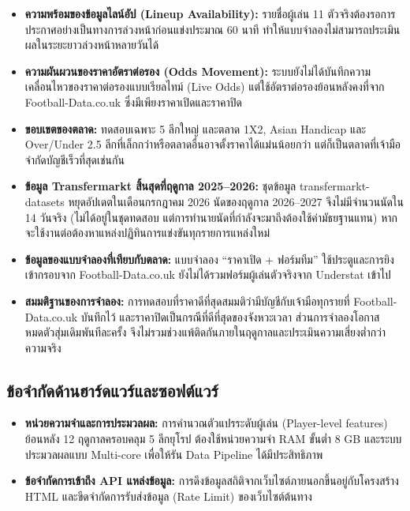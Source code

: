 \begin{itemize}
    \item \textbf{ความพร้อมของข้อมูลไลน์อัป (Lineup Availability):} รายชื่อผู้เล่น 11 ตัวจริงต้องรอการประกาศอย่างเป็นทางการล่วงหน้าก่อนแข่งประมาณ 60 นาที ทำให้แบบจำลองไม่สามารถประเมินผลในระยะยาวล่วงหน้าหลายวันได้
    \item \textbf{ความผันผวนของราคาอัตราต่อรอง (Odds Movement):} ระบบยังไม่ได้บันทึกความเคลื่อนไหวของราคาต่อรองแบบเรียลไทม์ (Live Odds) แต่ใช้อัตราต่อรองย้อนหลังคงที่จาก Football-Data.co.uk ซึ่งมีเพียงราคาเปิดและราคาปิด
    \item \textbf{ขอบเขตของตลาด:} ทดสอบเฉพาะ 5 ลีกใหญ่ และตลาด 1X2, Asian Handicap และ Over/Under 2.5 ลีกที่เล็กกว่าหรือตลาดอื่นอาจตั้งราคาได้แม่นน้อยกว่า แต่ก็เป็นตลาดที่เจ้ามือจำกัดบัญชีเร็วที่สุดเช่นกัน
    \item \textbf{ข้อมูล Transfermarkt สิ้นสุดที่ฤดูกาล 2025--2026:} ชุดข้อมูล transfermarkt-datasets หยุดอัปเดตในเดือนกรกฎาคม 2026 นัดของฤดูกาล 2026--2027 จึงไม่มีจำนวนนัดใน 14 วันจริง (ไม่ได้อยู่ในชุดทดสอบ แต่การทำนายนัดที่กำลังจะมาถึงต้องใช้ค่ามัธยฐานแทน) หากจะใช้งานต่อต้องหาแหล่งปฏิทินการแข่งขันทุกรายการแหล่งใหม่
    \item \textbf{ข้อมูลของแบบจำลองที่เทียบกับตลาด:} แบบจำลอง ``ราคาเปิด + ฟอร์มทีม'' ใช้ประตูและการยิงเข้ากรอบจาก Football-Data.co.uk ยังไม่ได้รวมฟอร์มผู้เล่นตัวจริงจาก Understat เข้าไป
    \item \textbf{สมมติฐานของการจำลอง:} การทดสอบที่ราคาดีที่สุดสมมติว่ามีบัญชีกับเจ้ามือทุกรายที่ Football-Data.co.uk บันทึกไว้ และราคาปิดเป็นกรณีที่ดีที่สุดของจังหวะเวลา ส่วนการจำลองโอกาสหมดตัวสุ่มเดิมพันทีละครั้ง จึงไม่รวมช่วงแพ้ติดกันภายในฤดูกาลและประเมินความเสี่ยงต่ำกว่าความจริง
\end{itemize}

\subsection{ข้อจำกัดด้านฮาร์ดแวร์และซอฟต์แวร์}

\begin{itemize}
    \item \textbf{หน่วยความจำและการประมวลผล:} การคำนวณตัวแปรระดับผู้เล่น (Player-level features) ย้อนหลัง 12 ฤดูกาลครอบคลุม 5 ลีกยุโรป ต้องใช้หน่วยความจำ RAM ขั้นต่ำ 8 GB และระบบประมวลผลแบบ Multi-core เพื่อให้รัน Data Pipeline ได้มีประสิทธิภาพ
    \item \textbf{ข้อจำกัดการเข้าถึง API แหล่งข้อมูล:} การดึงข้อมูลสถิติจากเว็บไซต์ภายนอกขึ้นอยู่กับโครงสร้าง HTML และขีดจำกัดการรับส่งข้อมูล (Rate Limit) ของเว็บไซต์ต้นทาง
\end{itemize}

